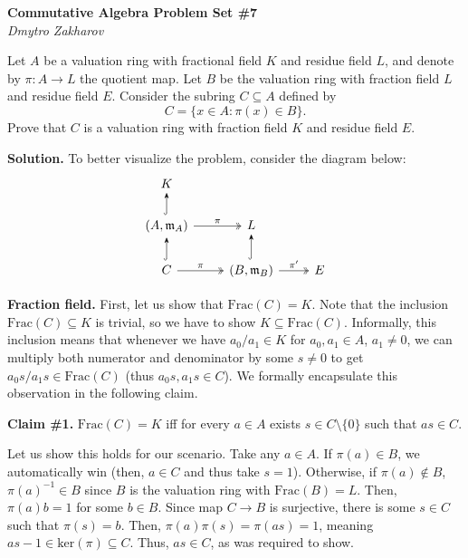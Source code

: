 \documentclass{template}
\begin{document}
\begin{center}
    \Large \textcolor{blue!70!black}{\textbf{Commutative Algebra Problem Set \#7}} \\
    \normalsize \textit{Dmytro Zakharov}
\end{center}

\begin{problem}[Exercise 1]
    Let $A$ be a valuation ring with fractional field $K$ and
    residue field $L$, and denote by $\pi: A \to L$ the quotient map. Let $B$
    be the valuation ring with fraction field $L$ and residue field $E$.
    Consider the subring $C \subseteq A$ defined by
    \begin{equation*}
        C = \{x \in A: \pi(x) \in B\}.
    \end{equation*}
    Prove that $C$ is a valuation ring with fraction field $K$ and residue field
    $E$.
\end{problem}

\textbf{Solution.} To better visualize the problem, consider the diagram below:
\[
    \begin{tikzcd}
        K & \\
        (A,\mathfrak{m}_A) \arrow[-Stealth, hook]{u}{} \arrow[two heads]{r}{\pi} & L \\
        C \arrow[-Stealth, hook]{u}{} \arrow[two heads]{r}{\pi} & (B,\mathfrak{m}_B) \arrow[-Stealth, hook]{u}{} \arrow[two heads]{r}{\pi'} & E
    \end{tikzcd}
\]

\textcolor{blue!70!black}{\textbf{Fraction field.}} First, let us show that
$\text{Frac}(C) = K$. Note that the inclusion $\text{Frac}(C) \subseteq K$ is
trivial, so we have to show $K \subseteq \text{Frac}(C)$. Informally, this
inclusion means that whenever we have $a_0/a_1 \in K$ for $a_0,a_1 \in A$, $a_1
\neq 0$, we can multiply both numerator and denominator by some $s \neq 0$ to
get $a_0s/a_1s \in \text{Frac}(C)$ (thus $a_0s, a_1s \in C$). We formally
encapsulate this observation in the following claim.

\textbf{Claim \#1.} $\text{Frac}(C) = K$ iff for every $a \in A$ exists $s \in C
\setminus \{0\}$ such that $as \in C$.

Let us show this holds for our scenario. Take any $a \in A$. If $\pi(a) \in B$,
we automatically win (then, $a \in C$ and thus take $s = 1$). Otherwise, if
$\pi(a) \not\in B$, $\pi(a)^{-1} \in B$ since $B$ is the valuation ring with
$\text{Frac}(B) = L$. Then, $\pi(a)b=1$ for some $b \in B$. Since map $C \to B$
is surjective, there is some $s \in C$ such that $\pi(s)=b$. Then, $\pi(a)\pi(s)
= \pi(as)=1$, meaning $as-1 \in \text{ker}(\pi) \subseteq C$. Thus, $as \in C$,
as was required to show.
\end{document}
